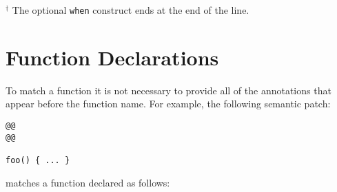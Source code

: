 $^\dag$ The optional \texttt{when} construct ends at the end of the line.

\section{Function Declarations}

\begin{grammar}







\end{grammar}

\begin{grammar}
\end{grammar}

To match a function it is not necessary to provide all of the annotations
that appear before the function name.  For example, the following semantic
patch:

\begin{lstlisting}[language=Cocci]
@@
@@

foo() { ... }
\end{lstlisting}

\noindent
matches a function declared as follows:

